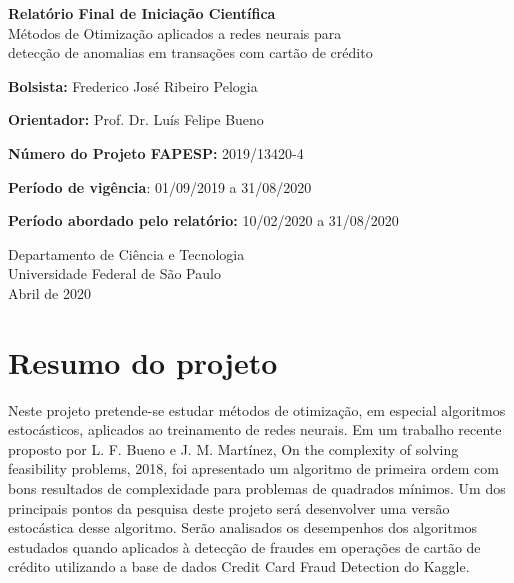 \documentclass[a4paper,12pt]{article}
\begin{document}
\begin{titlepage}
   \begin{center}
       \vspace*{1cm}
 
       \Large
       \textbf{Relatório Final de Iniciação Científica}\\
       Métodos de Otimização aplicados a redes neurais para \\ detecção de anomalias em transações com cartão de crédito
 	   
 	   \normalsize
       \vspace{5.5cm}
        \textbf{Bolsista:} Frederico José Ribeiro Pelogia
        
       \vspace{0.5cm}
        \textbf{Orientador:} Prof. Dr. Luís Felipe Bueno
 
       \vspace{0.5cm}
 
       \textbf{Número do Projeto FAPESP:} 2019/13420-4\\
       
      \vspace{0.5cm}
      
		\textbf{Período de vigência}: 01/09/2019 a 31/08/2020    
      
      \vspace{0.5cm}
		\textbf{Período abordado pelo relatório:} 10/02/2020 a 31/08/2020
 
       \vfill

 
 
       Departamento de Ciência e Tecnologia\\
       Universidade Federal de São Paulo\\
       Abril de 2020
 
   \end{center}
\end{titlepage}

\section*{Resumo do projeto}
 Neste projeto pretende-se estudar métodos de otimização, em especial algoritmos estocásticos,
aplicados ao treinamento de redes neurais. Em um trabalho recente proposto por L. F. Bueno e
J. M. Martínez, On the complexity of solving feasibility problems, 2018, foi apresentado um algoritmo
de primeira ordem com bons resultados de complexidade para problemas de quadrados mínimos.
Um dos principais pontos da pesquisa deste projeto será desenvolver uma versão estocástica desse
algoritmo. Serão analisados os desempenhos dos algoritmos estudados quando aplicados à detecção
de fraudes em operações de cartão de crédito utilizando a base de dados Credit Card Fraud Detection
do Kaggle.
\end{document}
